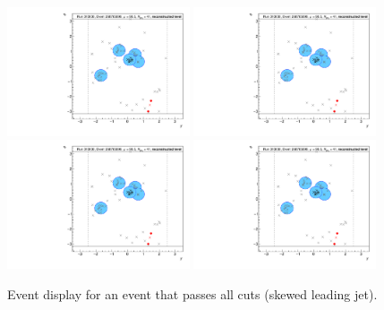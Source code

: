 \begin{figure}[h!]
  \centering
  \includegraphics[page=61,width=0.48\textwidth]{figures/EventDisplays.pdf}
  \includegraphics[page=62,width=0.48\textwidth]{figures/EventDisplays.pdf} \\
  \includegraphics[page=64,width=0.48\textwidth]{figures/EventDisplays.pdf}
  \includegraphics[page=65,width=0.48\textwidth]{figures/EventDisplays.pdf}
  \caption{Event display for an event that passes all cuts (skewed leading jet).}
  \label{fig:event-display-4}
\end{figure}

